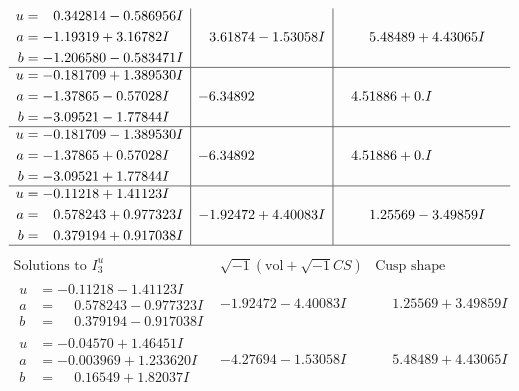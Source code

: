 \documentclass[1p]{elsarticle_modified}
\theoremstyle{definition}
\newcommand{\I}{\sqrt{-1}}
\begin{document}
$$\begin{array}{c|c|c}
\begin{aligned}
u &= \phantom{-}0.342814 - 0.586956 I \\
a &= -1.19319 + 3.16782 I \\
b &= -1.206580 - 0.583471 I\end{aligned}
 & \phantom{-}3.61874 - 1.53058 I & \phantom{-}5.48489 + 4.43065 I \\ \hline\begin{aligned}
u &= -0.181709 + 1.389530 I \\
a &= -1.37865 - 0.57028 I \\
b &= -3.09521 - 1.77844 I\end{aligned}
 & -6.34892\phantom{ +0.000000I} & \phantom{-}4.51886 + 0. I\phantom{ +0.000000I} \\ \hline\begin{aligned}
u &= -0.181709 - 1.389530 I \\
a &= -1.37865 + 0.57028 I \\
b &= -3.09521 + 1.77844 I\end{aligned}
 & -6.34892\phantom{ +0.000000I} & \phantom{-}4.51886 + 0. I\phantom{ +0.000000I} \\ \hline\begin{aligned}
u &= -0.11218 + 1.41123 I \\
a &= \phantom{-}0.578243 + 0.977323 I \\
b &= \phantom{-}0.379194 + 0.917038 I\end{aligned}
 & -1.92472 + 4.40083 I & \phantom{-}1.25569 - 3.49859 I\\
 \hline 
 \end{array}$$\newpage$$\begin{array}{c|c|c}  
\text{Solutions to }I^u_{3}& \I (\text{vol} + \sqrt{-1}CS) & \text{Cusp shape}\\
 \hline 
\begin{aligned}
u &= -0.11218 - 1.41123 I \\
a &= \phantom{-}0.578243 - 0.977323 I \\
b &= \phantom{-}0.379194 - 0.917038 I\end{aligned}
 & -1.92472 - 4.40083 I & \phantom{-}1.25569 + 3.49859 I \\ \hline\begin{aligned}
u &= -0.04570 + 1.46451 I \\
a &= -0.003969 + 1.233620 I \\
b &= \phantom{-}0.16549 + 1.82037 I\end{aligned}
 & -4.27694 - 1.53058 I & \phantom{-}5.48489 + 4.43065 I \\ \hline\begin{aligned}

\end{aligned}
\end{array}$$
\end{document}
